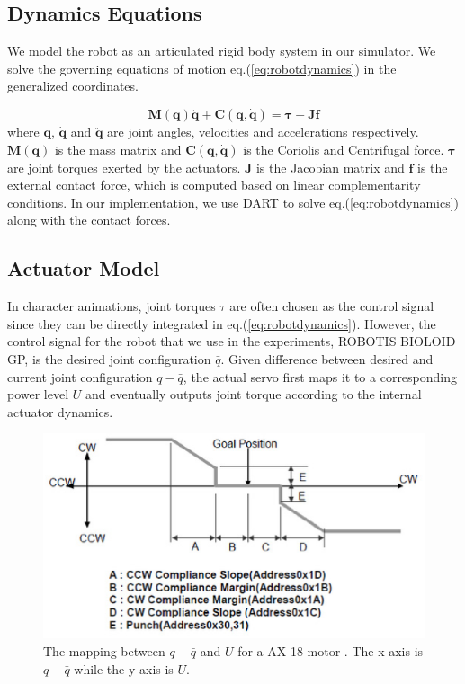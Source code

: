 \subsection{Dynamics Equations}

We model the robot as an articulated rigid body system in our simulator. We solve the governing equations of motion eq.(\ref{eq:robotdynamics}) in the generalized coordinates.

\begin{equation}
\label{eq:robotdynamics}
\mathbf{M}(\mathbf{q})\mathbf{\ddot{q}}+\mathbf{C}(\mathbf{q},\mathbf{\dot{q}})=\mathbf{\tau}+\mathbf{Jf}
\end{equation}
where $\mathbf{q}$, $\mathbf{\dot{q}}$ and $\mathbf{\ddot{q}}$ are joint angles, velocities and accelerations respectively. $\mathbf{M}(\mathbf{q})$ is the mass matrix and $\mathbf{C}(\mathbf{q},\mathbf{\dot{q}})$ is the Coriolis and Centrifugal force. $\mathbf{\tau}$ are joint torques exerted by the actuators. $\mathbf{J}$ is the Jacobian matrix and $\mathbf{f}$ is the external contact force, which is computed based on linear complementarity conditions. In our implementation, we use DART to solve eq.(\ref{eq:robotdynamics}) along with the contact forces.

\subsection{Actuator Model}

In character animations, joint torques $\tau$ are often chosen as the control signal since they can be directly integrated in eq.(\ref{eq:robotdynamics}). However, the control signal for the robot that we use in the experiments, ROBOTIS BIOLOID GP, is the desired joint configuration $\bar{q}$. Given difference between desired and current joint configuration ${q-\bar{q}}$, the actual servo first maps it to a corresponding power level $U$ and eventually outputs joint torque according to the internal actuator dynamics.

\begin{figure}[t]
\centering
\includegraphics[width=5in]{figures/ax18gain.eps}
\caption{The mapping between $q-\bar{q}$ and $U$ for a AX-18 motor \cite{AX18:2015}. The x-axis is $q-\bar{q}$ while the y-axis is $U$.}
\label{fig:actuatorMap}
\end{figure}

